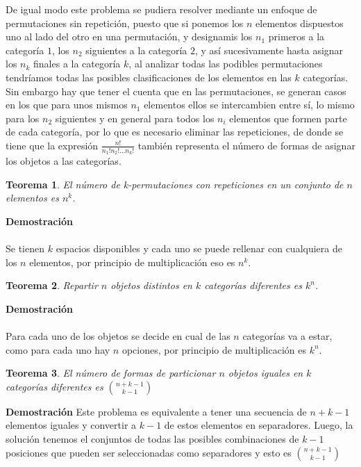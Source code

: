 \documentclass[a4paper,12pt]{report}
\newtheorem*{teo}{Teorema}
\begin{document}
De igual modo este problema se pudiera resolver mediante un enfoque de permutaciones sin repetici\'on, puesto que si ponemos los $n$ elementos dispuestos uno al lado del otro en una permutaci\'on, y designamis los $n_1$ primeros a la categor\'ia $1$, los $n_2$ siguientes a la categor\'ia $2$, y as\'i sucesivamente hasta asignar los $n_k$ finales a la categor\'ia $k$, al analizar todas las podibles permutaciones tendr\'iamos todas las posibles clasificaciones de los elementos en las $k$ categor\'ias.
Sin embargo hay que tener el cuenta que en las permutaciones, se generan casos en los que para unos mismos $n_1$ elementos ellos se intercambien entre s\'i, lo mismo para los $n_2$ siguientes y en general para todos los $n_i$ elementos que formen parte de cada categor\'ia, por lo que es necesario eliminar las repeticiones, de donde se tiene que la expresi\'on $\frac{n!}{n_1!n_2!\dots n_k!}$ tambi\'en representa el n\'umero de formas de asignar los objetos a las categor\'ias.

\begin{teo}
    El n\'umero de k-permutaciones con repeticiones en un conjunto de $n$ elementos es $n^k$.
\end{teo}

\textbf{Demostración}\\\\
Se tienen $k$ espacios disponibles y cada uno se puede rellenar con cualquiera de los $n$ elementos, por principio de multiplicaci\'on eso es $n^k$.

\begin{teo}
    Repartir $n$ objetos distintos en $k$ categor\'ias diferentes es $k^n$.
\end{teo}

\textbf{Demostración}\\\\
Para cada uno de los objetos se decide en cual de las $n$ categor\'ias va a estar, como para cada uno hay $n$ opciones, por principio de multiplicaci\'on es $k^n$.

\begin{teo}
 El número de formas de particionar $n$ objetos iguales en $k$ categorías diferentes es ${n+k-1}\choose{k-1}$
\end{teo}


\textbf{Demostración}
Este problema es equivalente a tener una secuencia de $n+k-1$ elementos iguales y convertir a $k-1$ de estos elementos en separadores. Luego, la solución tenemos el conjuntos de todas las posibles combinaciones de $k-1$ posiciones que pueden ser seleccionadas como separadores y esto es ${n+k-1}\choose{k-1}$
\end{document}

